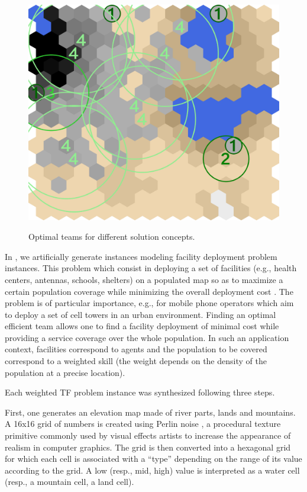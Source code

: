 \documentclass[conference]{IEEEtran}
\theoremstyle{definition}
\begin{document}
\begin{figure}[tp]
{		\label{subfig:map-solutionKTF}
		\includegraphics[width=\widthmap\textwidth]{TF-1-KTF-k1}
	}
	\caption{Optimal teams for different solution concepts.}
	\label{fig:map-solution}
\end{figure}


In \cite{schwind2021}, we artificially generate instances modeling facility deployment problem instances.
This problem which consist in deploying a set of facilities 
(e.g., health centers, antennas, schools, shelters) on a populated map
so as to maximize a certain population coverage while minimizing the overall deployment cost \cite{fac}.
The problem is of particular importance, e.g., for mobile phone operators 
which aim to deploy a set of cell towers in an urban environment.
Finding an optimal efficient team allows one to find a facility deployment 
of minimal cost while providing a service coverage over
the whole population. In such an application context, facilities correspond to agents 
and the population to be covered correspond to a weighted skill
(the weight depends on the density of the population at a precise location).

Each weighted TF problem instance was synthesized following three steps.



First, one generates an elevation map made of river parts, lands and mountains. 
A 16x16 grid of numbers is created using
Perlin noise \cite{perlin}, a procedural texture primitive commonly used by visual 
effects artists to increase the appearance of realism in
computer graphics. The grid is then converted into a hexagonal grid for which each cell is associated with
a ``type'' depending on the range of its value according to the grid.
A low (resp., mid, high) value is interpreted as a water cell (resp., a mountain cell, a land cell).
\end{document}
